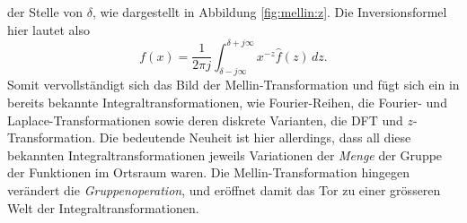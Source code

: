 der Stelle von $\delta$, wie dargestellt in Abbildung 
\ref{fig:mellin:z}.
Die Inversionsformel hier lautet also
\begin{equation}
    f(x) 
    = \frac{1}{2\pi j} 
    \int_{\delta -j\infty}^{\delta +j\infty} 
    x^{-z} \hat{f}(z) \,{d}z
    .
    \label{mellin:mellininv}
\end{equation}
Somit vervollständigt sich das Bild der Mellin-Transformation und fügt 
sich ein in bereits bekannte Integraltransformationen, wie 
Fourier-Reihen, die Fourier- und Laplace-Transformationen sowie deren 
diskrete Varianten, die DFT und $z$-Transformation. 
Die bedeutende Neuheit ist hier allerdings, dass all diese bekannten 
Integraltransformationen jeweils Variationen der {\em Menge} der 
Gruppe der Funktionen im Ortsraum waren.
Die Mellin-Transformation hingegen verändert die 
{\em Gruppenoperation}, und eröffnet damit das Tor zu einer grösseren 
Welt der Integraltransformationen.
